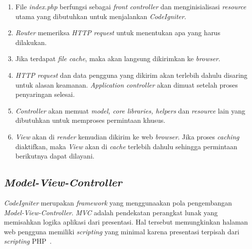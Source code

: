 \begin{enumerate}
	\item File \textit{index.php} berfungsi sebagai \textit{front controller} dan menginisialisasi \textit{resource} utama yang dibutuhkan untuk menjalankan \textit{CodeIgniter}.
	\item \textit{Router} memeriksa \textit{HTTP request} untuk menentukan apa yang harus dilakukan.
	\item Jika terdapat \textit{file cache}, maka akan langsung dikirimkan ke \textit{browser}.
	\item \textit{HTTP request} dan data pengguna yang dikirim akan terlebih dahulu disaring untuk alasan keamanan. \textit{Application controller} akan dimuat setelah proses penyaringan selesai.
	\item \textit{Controller} akan memuat \textit{model, core libraries, helpers} dan \textit{resource} lain yang dibutuhkan untuk memproses permintaan khusus.
	\item \textit{View} akan di \textit{render} kemudian dikirim ke web \textit{browser}. Jika proses \textit{caching} diaktifkan, maka \textit{View} akan di \textit{cache} terlebih dahulu sehingga permintaan berikutnya dapat dilayani.
\end{enumerate}

\subsection{\textit{Model-View-Controller}}
\textit{CodeIgniter} merupakan \textit{framework} yang menggunaakan pola pengembangan \textit{Model-View-Controller}. \textit{MVC} adalah pendekatan perangkat lunak yang memisahkan logika aplikasi dari presentasi. Hal tersebut memungkinkan halaman web pengguna memiliki \textit{scripting} yang minimal karena presentasi terpisah dari \textit{scripting} PHP~\cite{bcit:17:cidoc}. \\

